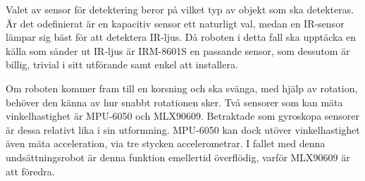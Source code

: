 \documentclass[11pt]{article}
\begin{document}
\begin{flushleft}
Valet av sensor för detektering beror på vilket typ av objekt som ska detekteras. Är det odefinierat är en kapacitiv sensor ett naturligt val, medan en IR-sensor lämpar sig bäst för att detektera IR-ljus. Då roboten i detta fall ska upptäcka en källa som sänder ut IR-ljus är IRM-8601S en passande sensor, som dessutom är billig, trivial i sitt utförande samt enkel att installera.

Om roboten kommer fram till en korsning och ska svänga, med hjälp av rotation, behöver den känna av hur snabbt rotationen sker. Två sensorer som kan mäta vinkelhastighet är MPU-6050 och MLX90609. Betraktade som gyroskopa sensorer är dessa relativt lika i sin utformning. MPU-6050 kan dock utöver vinkelhastighet även mäta acceleration, via tre stycken accelerometrar. I fallet med denna undsättningsrobot är denna funktion emellertid överflödig, varför MLX90609 är att föredra. 


\pagebreak
{}




\pagebreak
\appendix

\end{flushleft}



\end{document}
